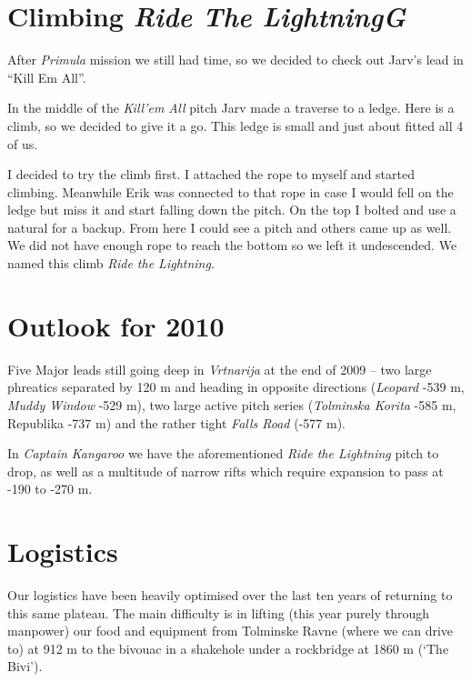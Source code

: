 \attrib{\izi}

\hypertarget{climbing-ride-the-lightningg}{%
\section{\texorpdfstring{Climbing \emph{Ride The
LightningG}}{Climbing Ride The LightningG}}\label{climbing-ride-the-lightningg}}

After \emph{Primula} mission we still had time, so we decided to check
out Jarv's lead in ``Kill Em All''.

In the middle of the \emph{Kill'em All} pitch Jarv made a traverse to a
ledge. Here is a climb, so we decided to give it a go. This ledge is
small and just about fitted all 4 of us.

I decided to try the climb first. I attached the rope to myself and
started climbing. Meanwhile Erik was connected to that rope in case I
would fell on the ledge but miss it and start falling down the pitch. On
the top I bolted and use a natural for a backup. From here I could see a
pitch and others came up as well. We did not have enough rope to reach
the bottom so we left it undescended. We named this climb \emph{Ride the
Lightning}.

\attrib{\izi}

\hypertarget{outlook-for-2010}{%
\section{Outlook for 2010}\label{outlook-for-2010}}

Five Major leads still going deep in \emph{Vrtnarija} at the end of 2009
-- two large phreatics separated by 120 m and heading in opposite
directions (\emph{Leopard} -539 m, \emph{Muddy Window} -529 m), two
large active pitch series (\emph{Tolminska Korita} -585 m, Republika
-737 m) and the rather tight \emph{Falls Road} (-577 m).

In \emph{Captain Kangaroo} we have the aforementioned \emph{Ride the
Lightning} pitch to drop, as well as a multitude of narrow rifts which
require expansion to pass at -190 to -270 m.

\hypertarget{logistics}{%
\section{Logistics}\label{logistics}}

Our logistics have been heavily optimised over the last ten years of
returning to this same plateau. The main difficulty is in lifting (this
year purely through manpower) our food and equipment from Tolminske
Ravne (where we can drive to) at 912 m to the bivouac in a shakehole
under a rockbridge at 1860 m (`The Bivi').

